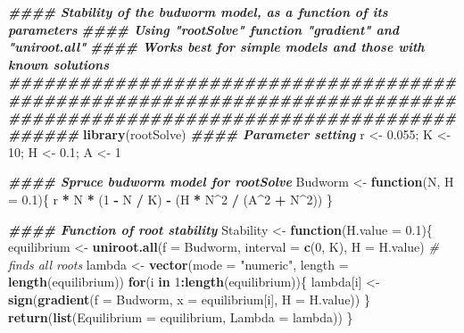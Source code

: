 \documentclass[
]{book}
\newenvironment{Shaded}{\begin{snugshade}}{\end{snugshade}}
\newcommand{\AttributeTok}[1]{\textcolor[rgb]{0.13,0.29,0.53}{#1}}
\newcommand{\CommentTok}[1]{\textcolor[rgb]{0.56,0.35,0.01}{\textit{#1}}}
\newcommand{\ControlFlowTok}[1]{\textcolor[rgb]{0.13,0.29,0.53}{\textbf{#1}}}
\newcommand{\DecValTok}[1]{\textcolor[rgb]{0.00,0.00,0.81}{#1}}
\newcommand{\DocumentationTok}[1]{\textcolor[rgb]{0.56,0.35,0.01}{\textbf{\textit{#1}}}}
\newcommand{\FloatTok}[1]{\textcolor[rgb]{0.00,0.00,0.81}{#1}}
\newcommand{\FunctionTok}[1]{\textcolor[rgb]{0.13,0.29,0.53}{\textbf{#1}}}
\newcommand{\NormalTok}[1]{#1}
\newcommand{\OtherTok}[1]{\textcolor[rgb]{0.56,0.35,0.01}{#1}}
\newcommand{\SpecialCharTok}[1]{\textcolor[rgb]{0.81,0.36,0.00}{\textbf{#1}}}
\newcommand{\StringTok}[1]{\textcolor[rgb]{0.31,0.60,0.02}{#1}}
\begin{document}
\begin{Shaded}
\begin{Highlighting}[]
\DocumentationTok{\#\#\#\# Stability of the budworm model, as a function of its parameters}
\DocumentationTok{\#\#\#\# Using "rootSolve" function "gradient" and "uniroot.all"}
\DocumentationTok{\#\#\#\# Works best for simple models and those with known solutions}
\DocumentationTok{\#\#\#\#\#\#\#\#\#\#\#\#\#\#\#\#\#\#\#\#\#\#\#\#\#\#\#\#\#\#\#\#\#\#\#\#\#\#\#\#\#\#\#\#\#\#\#\#\#\#\#\#\#\#\#\#\#\#\#\#\#\#\#\#\#\#\#\#\#\#\#\#\#\#\#\#\#\#\#\#\#\#\#\#\#\#\#\#\#\#\#\#\#\#\#\#\#\#\#\#\#\#\#\#\#\#\#\#\#\#\#\#\#\#\#\#\#\#\#\#}
\FunctionTok{library}\NormalTok{(rootSolve)}
\DocumentationTok{\#\#\#\# Parameter setting}
\NormalTok{r }\OtherTok{\textless{}{-}} \FloatTok{0.055}\NormalTok{; K }\OtherTok{\textless{}{-}} \DecValTok{10}\NormalTok{; H }\OtherTok{\textless{}{-}} \FloatTok{0.1}\NormalTok{; A }\OtherTok{\textless{}{-}} \DecValTok{1}

\DocumentationTok{\#\#\#\# Spruce budworm model for rootSolve}
\NormalTok{Budworm }\OtherTok{\textless{}{-}} \ControlFlowTok{function}\NormalTok{(N, }\AttributeTok{H =} \FloatTok{0.1}\NormalTok{)\{}
\NormalTok{  r }\SpecialCharTok{*}\NormalTok{ N }\SpecialCharTok{*}\NormalTok{ (}\DecValTok{1} \SpecialCharTok{{-}}\NormalTok{ N }\SpecialCharTok{/}\NormalTok{ K) }\SpecialCharTok{{-}}\NormalTok{ (H }\SpecialCharTok{*}\NormalTok{ N}\SpecialCharTok{\^{}}\DecValTok{2} \SpecialCharTok{/}\NormalTok{ (A}\SpecialCharTok{\^{}}\DecValTok{2} \SpecialCharTok{+}\NormalTok{ N}\SpecialCharTok{\^{}}\DecValTok{2}\NormalTok{))}
\NormalTok{\}}

\DocumentationTok{\#\#\#\# Function of root stability}
\NormalTok{Stability }\OtherTok{\textless{}{-}} \ControlFlowTok{function}\NormalTok{(}\AttributeTok{H.value =} \FloatTok{0.1}\NormalTok{)\{}
\NormalTok{  equilibrium }\OtherTok{\textless{}{-}} \FunctionTok{uniroot.all}\NormalTok{(}\AttributeTok{f =}\NormalTok{ Budworm, }\AttributeTok{interval =} \FunctionTok{c}\NormalTok{(}\DecValTok{0}\NormalTok{, K), }\AttributeTok{H =}\NormalTok{ H.value) }\CommentTok{\# finds all roots}
\NormalTok{  lambda }\OtherTok{\textless{}{-}} \FunctionTok{vector}\NormalTok{(}\AttributeTok{mode =} \StringTok{"numeric"}\NormalTok{, }\AttributeTok{length =} \FunctionTok{length}\NormalTok{(equilibrium))}
  \ControlFlowTok{for}\NormalTok{(i }\ControlFlowTok{in} \DecValTok{1}\SpecialCharTok{:}\FunctionTok{length}\NormalTok{(equilibrium))\{}
\NormalTok{    lambda[i] }\OtherTok{\textless{}{-}} \FunctionTok{sign}\NormalTok{(}\FunctionTok{gradient}\NormalTok{(}\AttributeTok{f =}\NormalTok{ Budworm, }\AttributeTok{x =}\NormalTok{ equilibrium[i], }\AttributeTok{H =}\NormalTok{ H.value))}
\NormalTok{  \}}
  \FunctionTok{return}\NormalTok{(}\FunctionTok{list}\NormalTok{(}\AttributeTok{Equilibrium =}\NormalTok{ equilibrium,}
              \AttributeTok{Lambda =}\NormalTok{ lambda))}
\NormalTok{\}}


\end{Highlighting}
\end{Shaded}
\end{document}
